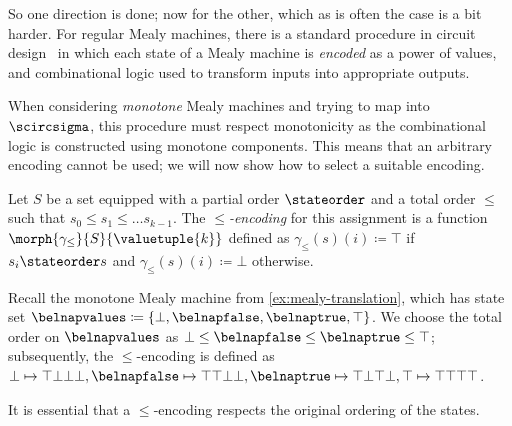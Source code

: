 So one direction is done; now for the other, which as is often the case is
a bit harder.
For regular Mealy machines, there is a standard procedure in circuit
design~\cite{kohavi2009switching} in which each state of a Mealy machine is
\emph{encoded} as a power of values, and combinational logic used to transform
inputs into appropriate outputs.

\begin{example}
\end{example}

When considering \emph{monotone} Mealy machines and trying to map into
\(\scircsigma\), this procedure must respect monotonicity as the combinational
logic is constructed using monotone components.
This means that an arbitrary encoding cannot be used; we will now show how to
select a suitable encoding.

\begin{definition}
    Let \(S\) be a set equipped with a partial order \(\stateorder\) and a total
    order \(\leq\) such that \(s_0 \leq s_1 \leq \dots s_{k-1}\).
    The \emph{\(\leq\)-encoding} for this assignment is a function
    \(\morph{\gamma_\leq}{S}{\valuetuple{k}}\) defined as
    \(\gamma_\leq(s)(i) \coloneqq \top\) if \(s_i \stateorder s\) and
    \(\gamma_\leq(s)(i) \coloneqq \bot\) otherwise.
\end{definition}

\begin{example}
    Recall the monotone Mealy machine from \cref{ex:mealy-translation}, which
    has state set \(
        \belnapvalues \coloneqq \{\bot,\belnapfalse,\belnaptrue,\top\}
    \).
    We choose the total order on \(\belnapvalues\) as
    \(\bot \leq \belnapfalse \leq \belnaptrue \leq \top\); subsequently, the
    \(\leq\)-encoding is defined as \(
        \bot \mapsto \top\bot\bot\bot, \belnapfalse \mapsto \top\top\bot\bot,
        \belnaptrue \mapsto \top\bot\top\bot, \top \mapsto \top\top\top\top
    \).
\end{example}

It is essential that a \(\leq\)-encoding respects the original ordering of the
states.

